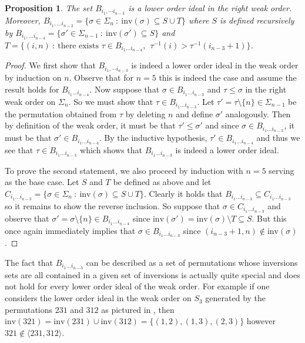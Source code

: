 \documentclass[12pt, reqno]{amsart}
\numberwithin{equation}{section}
\theoremstyle{plain}
\newtheorem{proposition}[theorem]{Proposition}
\theoremstyle{definition}
\newcommand{\inv}{\mathrm{inv}}
\begin{document}
\begin{proposition}
The set $B_{i_1, \cdots i_{n-3}}$ is a lower order ideal in the right weak order. Moreover, $B_{i_1, \ldots i_{n-3}} = \{\sigma \in \Sigma_n ~:~ \inv(\sigma) \subseteq S \cup T\}$ where
$S$ is defined recursively by $B_{i_1, \ldots i_{n-4}} = \{\sigma' \in \Sigma_{n-1} ~:~ \inv(\sigma') \subseteq S\}$ and $T = \{(i, n) ~:~ \text{there exists } \tau \in B_{i_1 \ldots i_{n-4}}, ~~\tau^{-1}(i) > \tau^{-1}(i_{n-3} + 1) \}$.
\end{proposition}
\begin{proof}
We first show that $B_{i_1, \cdots i_{n-3}}$ is indeed a lower order ideal in the weak order by induction on $n$. Observe that for $n = 5$ this is indeed the case and assume the result holds for $B_{i_1 \ldots i_{n-4}}$. 
Now suppose that $\sigma \in B_{i_1 \ldots i_{n-3}}$ and $\tau \leq \sigma$ in the right weak order on $\Sigma_{n}$. So we must show that $\tau \in B_{i_1 \ldots i_{n-3}}$. Let $\tau' = \tau \setminus \{n\} \in \Sigma_{n-1}$ be the permutation obtained from $\tau$ by deleting $n$ and define $\sigma'$ analogously. Then by definition of the weak order, it must be that $\tau' \leq \sigma'$ and since $\sigma \in B_{i_1 \ldots i_{n-3}}$, it must be that $\sigma' \in B_{i_1 \ldots i_{n-4}}$. 
By the inductive hypothesis, $\tau' \in B_{i_1 \ldots i_{n-4}}$ and thus we see that $\tau \in B_{i_1 \ldots i_{n-3}}$ which shows that $B_{i_1 \ldots i_{n-3}}$ is indeed a lower order ideal. 

To prove the second statement, we also proceed by induction with $n = 5$ serving as the base case. Let $S$ and $T$ be defined as above and let $C_{i_1 \ldots i_{n-3}} = \{\sigma \in \Sigma_n ~:~ \inv(\sigma) \subseteq S \cup T\}$. Clearly it holds that $B_{i_1 \ldots i_{n-3}} \subseteq C_{i_1 \ldots i_{n-3}}$ so it remains to show the reverse inclusion. So suppose that $\sigma \in C_{i_1 \ldots i_{n-3}}$ and observe that $\sigma' = \sigma \setminus \{n\} \in B_{i_1 \ldots i_{n-4}}$ since $\inv(\sigma') = \inv(\sigma) \setminus T \subseteq S$. But this once again immediately implies that $\sigma \in B_{i_1 \ldots i_{n-3}}$ since $(i_{n-3}+1, n) \notin \inv(\sigma)$.  
\end{proof}


The fact that $B_{i_1 \ldots i_{n-3}}$ can be described as a set of permutations whose inversions sets are all contained in a given set of inversions is actually quite special and does not hold for every lower order ideal of the weak order. For example if one considers the lower order ideal in the weak order on $S_3$ generated by the permutations $231$ and $312$ as pictured in , then $\inv(321) = \inv(231) \cup \inv(312) = \{(1,2), (1,3), (2,3)\}$ however $321 \notin \langle 231, 312 \rangle$.
\end{document}
